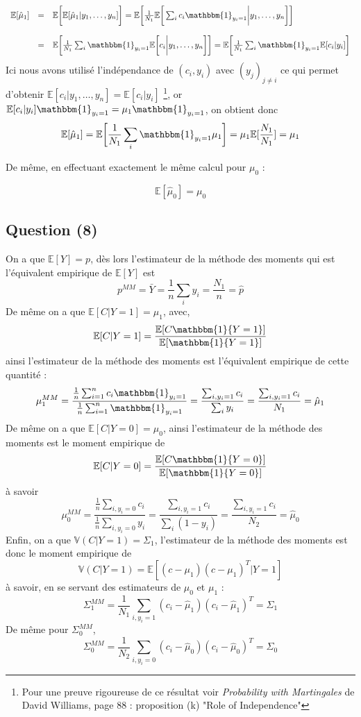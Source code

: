\documentclass[10pt,a4paper]{report}\usepackage[]{graphicx}\usepackage[]{color}
\begin{document}
$$
\begin{array}{rcl}
\mathbb{E}[\hat \mu_1] & = & \mathbb{E}\bigg{[} \mathbb{E}[\hat \mu_1 |y_1, \hdots , y_n] \bigg{]} = 
\mathbb{E}\bigg{[}\frac{1}{N_1} \mathbb{E}\bigg{[}\sum_{i} c_i \mathbbm{1}_{y_i=1} \bigg{|}y_1, \hdots , y_n \bigg{]} \bigg{]} \\ \\
& = & \mathbb{E}\bigg{[}\frac{1}{N_1} \sum_{i} \mathbbm{1}_{y_i=1} \mathbb{E}\bigg{[} c_i  \bigg{|}y_1, \hdots , y_n \bigg{]} \bigg{]} = \mathbb{E}\bigg{[}\frac{1}{N_1} \sum_{i} \mathbbm{1}_{y_i=1} \mathbb{E}[ c_i  | y_i ] \bigg{]} 
\end{array}
$$
Ici nous avons utilisé l'indépendance de $(c_i,y_i)$ avec $(y_j)_{j \neq i}$ ce qui permet d'obtenir $\mathbb{E}[ c_i  |y_1, \hdots , y_n ] = \mathbb{E}[ c_i  | y_i ]$ \footnote{Pour une preuve rigoureuse de ce résultat voir \emph{Probability with Martingales} de David Williams, page 88 : proposition (k) "Role of Independence"}, or $\mathbb{E}[ c_i  | y_i ] \mathbbm{1}_{y_i=1} = \mu_1 \mathbbm{1}_{y_i=1}$, on obtient donc \[ \mathbb{E}[\hat \mu_1] = \mathbb{E}\bigg{[}\frac{1}{N_1}\sum_{i} \mathbbm{1}_{y_i=1} \mu_1 \bigg{]} = \mu_1 \mathbb{E}[\frac{N_1}{N_1}] = \mu_1 \]

De même, en effectuant exactement le même calcul pour $\mu_0$ : 

$$
\mathbb{E}[\hat \mu_0]  = \mu_0
$$

\subsection{Question (8)}
On a que $\mathbb{E}[Y] = p$, d\`es lors l'estimateur de la m\'ethode des moments qui est l'équivalent empirique de $\mathbb{E}[Y]$ est
$$
p^{MM} = \bar Y = \frac{1}{n} \sum_i y_i = \frac{N_1}{n} = \hat p
$$
De m\^eme on a que $\mathbb{E}[C|Y=1] = \mu_1$, avec, 
$$
\mathbb{E}[C|Y=1]= \frac{\mathbb{E}[C\mathbbm{1}\{Y=1\}]}{\mathbb{E}[\mathbbm{1}\{Y=1\}]}
$$
ainsi l'estimateur de la m\'ethode des moments est l'équivalent empirique de cette quantité :
$$
\mu_1^{MM}=\frac{\frac{1}{n}\sum_{i=1}^n c_i \mathbbm{1}_{y_i=1}}{\frac{1}{n}\sum_{i=1}^n \mathbbm{1}_{y_i=1}} = \frac{\sum_{i,y_i=1}c_i}{\sum_{i}y_i} = \frac{\sum_{i,y_i=1}c_i}{N_1} = \hat \mu_1
$$
De m\^eme on a que $\mathbb{E}[C|Y=0] = \mu_0$, ainsi l'estimateur de la m\'ethode des moments est le moment empirique de 
$$
\mathbb{E}[C|Y=0]= \frac{\mathbb{E}[C\mathbbm{1}\{Y=0\}]}{\mathbb{E}[\mathbbm{1}\{Y=0\}]}
$$
\`a savoir 
$$
\mu_0^{MM}=\frac{\frac{1}{n}\sum_{i,y_i=0}c_i}{\frac{1}{n}\sum_{i,y_i=0}y_i}= \frac{\sum_{i,y_i=1}c_i}{\sum_{i}(1-y_i)} = \frac{\sum_{i,y_i=1}c_i}{N_2} = \hat \mu_0
$$
Enfin, on a que $\mathbb{V}(C|Y=1) = \Sigma_1$, l'estimateur de la m\'ethode des moments est donc le moment empirique de 
$$
\mathbb{V}(C|Y=1) = \mathbb{E}[(c-\mu_1)(c-\mu_1)^T|Y=1]
$$
\`a savoir, en se servant des estimateurs de $\mu_0$ et $\mu_1$ : 
$$
\Sigma_1^{MM}= \frac{1}{N_1}\sum_{i,y_i=1}(c_i-\hat{\mu}_1)(c_i-\hat{\mu}_1)^T = \hat \Sigma_1
$$ 
De m\^eme pour $\Sigma_0^{MM}$,
$$
\Sigma_0^{MM}= \frac{1}{N_2}\sum_{i,y_i=0}(c_i-\hat{\mu}_0)(c_i-\hat{\mu}_0)^T = \hat \Sigma_0
$$
\end{document}

